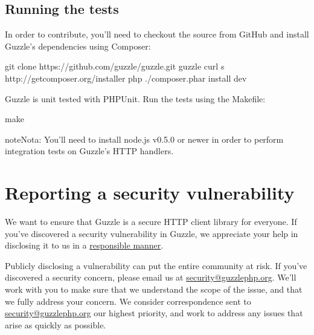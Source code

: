 \documentclass[a4paper,11pt,spanish]{sphinxmanual}
\begin{document}
\section{Running the tests}
\label{\detokenize{overview:running-the-tests}}
In order to contribute, you'll need to checkout the source from GitHub and
install Guzzle's dependencies using Composer:

\begin{sphinxVerbatim}[commandchars=\\\{\}]
git clone https://github.com/guzzle/guzzle.git
 guzzle  curl \PYGZhy{}s http://getcomposer.org/installer  php  ./composer.phar install \PYGZhy{}\PYGZhy{}dev
\end{sphinxVerbatim}

Guzzle is unit tested with PHPUnit. Run the tests using the Makefile:

\begin{sphinxVerbatim}[commandchars=\\\{\}]
make 
\end{sphinxVerbatim}

\begin{sphinxadmonition}{note}{Nota:}
You'll need to install node.js v0.5.0 or newer in order to perform
integration tests on Guzzle's HTTP handlers.
\end{sphinxadmonition}


\chapter{Reporting a security vulnerability}
\label{\detokenize{overview:reporting-a-security-vulnerability}}
We want to ensure that Guzzle is a secure HTTP client library for everyone. If
you've discovered a security vulnerability in Guzzle, we appreciate your help
in disclosing it to us in a \href{http://en.wikipedia.org/wiki/Responsible\_disclosure}{responsible manner}.

Publicly disclosing a vulnerability can put the entire community at risk. If
you've discovered a security concern, please email us at
\href{mailto:security@guzzlephp.org}{security@guzzlephp.org}. We'll work with you to make sure that we understand the
scope of the issue, and that we fully address your concern. We consider
correspondence sent to \href{mailto:security@guzzlephp.org}{security@guzzlephp.org} our highest priority, and work to
address any issues that arise as quickly as possible.
\end{document}
